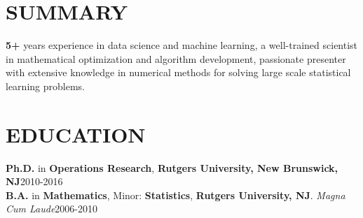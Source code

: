 \documentclass[10.5pt]{res} %
\begin{document}
\address{%
\quad Phone: (732) 447-6825~~E-mail:~~yaowang74\footnotesize{\MVAt}\normalsize{gmail.com}
~~Work Authorization: \textbf{U.S. Citizen}}%


\begin{resume}


\section{SUMMARY}
\textbf{5+} years experience in data science and machine learning, a well-trained scientist in mathematical optimization and algorithm development, passionate presenter with extensive knowledge in numerical methods for solving large scale statistical learning problems. %

\section{EDUCATION}
                \textbf{Ph.D.} in \textbf{Operations Research}, \textbf{Rutgers University, New Brunswick, NJ}\hfill 2010-2016\\
                \textbf{B.A.} in \textbf{Mathematics}, Minor: \textbf{Statistics}, \textbf{Rutgers University, NJ}. \emph{Magna Cum Laude}\hfill 2006-2010
%

\end{resume}
\end{document}
